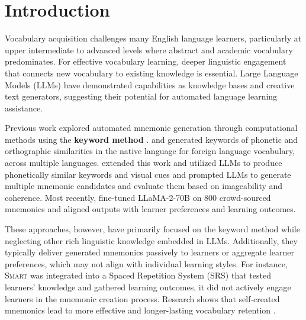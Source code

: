 \section{Introduction} \label{sec:intro}


Vocabulary acquisition challenges many English language learners, particularly at upper intermediate to advanced levels where abstract and academic vocabulary predominates. For effective vocabulary learning, deeper linguistic engagement that connects new vocabulary to existing knowledge is essential. Large Language Models (LLMs) have demonstrated capabilities as knowledge bases and creative text generators, suggesting their potential for automated language learning assistance.

Previous work explored automated mnemonic generation through computational methods using the \textbf{keyword method} \citep{atkinsonApplicationMnemonicKeyword1975}. \citet{savvaTransPhonerAutomatedMnemonic2014} and \citet{OzbalAUTOMATION2014} generated keywords of phonetic and orthographic similarities in the native language for foreign language vocabulary, across multiple languages. \citet{LeeSMARTPHONE2023} extended this work and utilized LLMs to produce phonetically similar keywords and visual cues and \citet{LeeEXPLORING2024} prompted LLMs to generate multiple mnemonic candidates and evaluate them based on imageability and coherence. Most recently, \citet{BalepurSMART2024} fine-tuned LLaMA-2-70B on 800 crowd-sourced mnemonics and aligned outputs with learner preferences and learning outcomes.

These approaches, however, have primarily focused on the keyword method while neglecting other rich linguistic knowledge embedded in LLMs. Additionally, they typically deliver generated mnemonics passively to learners or aggregate learner preferences, which may not align with individual learning styles. For instance, \textsc{Smart} \citep{BalepurSMART2024} was integrated into a Spaced Repetition System (SRS) that tested learners' knowledge and gathered learning outcomes, it did not actively engage learners in the mnemonic creation process. Research shows that self-created mnemonics lead to more effective and longer-lasting vocabulary retention \citep{madanExploringWordMemorability2021}.

